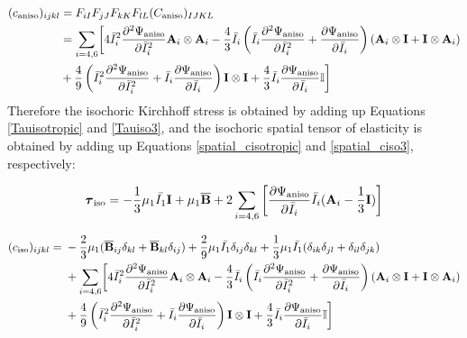 \begin{appendices}
\begin{equation} \label{spatial_ciso3}
\begin{split}
(c_\mathrm{aniso})_{ijkl} &=  F_{iI}F_{jJ}F_{kK}F_{lL}(C_\mathrm{aniso})_{IJKL} \\
&= 
 \sum_{i = 4, 6} \biggl[4{\bar{I}_i}^2\frac{\partial^2\Psi_\mathrm{aniso}}{\partial{\bar{I}_i}^2} \bold{A}_{i} \otimes \bold{A}_{i} - \frac{4}{3}\bar{I}_i\left(\bar{I}_i\frac{\partial^2\Psi_\mathrm{aniso}}{\partial{\bar{I}_i}^2} + \frac{\partial\Psi_\mathrm{aniso}}{\partial{\bar{I}_i}}\right)
 (\bold{A}_{i} \otimes \bold{I} + \bold{I} \otimes \bold{A}_i) \\
&+ \frac{4}{9}\left({\bar{I}_i}^2\frac{\partial^2\Psi_\mathrm{aniso}}{\partial{\bar{I}_i}^2} + \bar{I}_i\frac{\partial\Psi_\mathrm{aniso}}{\partial{\bar{I}_i}}\right)\bold{I} \otimes \bold{I} 
+ \frac{4}{3}\bar{I}_i \frac{\partial\Psi_\mathrm{aniso}}{\partial{\bar{I}_i}} \mathbb{I} \biggr]
\end{split}
\end{equation}
Therefore the isochoric Kirchhoff stress is obtained by adding up Equations \ref{Tauisotropic} and \ref{Tauiso3}, and the isochoric spatial tensor of elasticity is obtained by adding up Equations \ref{spatial_cisotropic} and \ref{spatial_ciso3}, respectively:

\begin{equation} \label{HGO_tauiso}
\boldsymbol{\tau}_\mathrm{iso} =  - \frac{1}{3}\mu_1\bar{I_1}\bold{I} + \mu_1{\overline{\bold{B}}}
+ 2\sum_{i = 4, 6}\left[\frac{\partial{\Psi_\mathrm{aniso}}}{\partial{\bar{I}_i}}\bar{I}_i (\bold{A}_{i} - \frac{1}{3}\bold{I})\right]
\end{equation}
 
\begin{equation} \label{HGO_spatial_ciso}
\begin{split}
(c_\mathrm{iso})_{ijkl} = {} &  - \frac{2}{3}\mu_1({\overline{\bold{B}}}_{ij}\delta_{kl} + {\overline{\bold{B}}}_{kl}\delta_{ij}) 
+ \frac{2}{9}\mu_1\bar{I_1}  \delta_{ij}\delta_{kl}
+ \frac{1}{3}\mu_1\bar{I_1} (\delta_{ik}\delta_{jl} + \delta_{il}\delta_{jk}) \\
&+ 
\sum_{i = 4, 6} \biggl[4{\bar{I}_i}^2\frac{\partial^2\Psi_\mathrm{aniso}}{\partial{\bar{I}_i}^2} \bold{A}_{i} \otimes \bold{A}_{i} - \frac{4}{3}\bar{I}_i\left(\bar{I}_i\frac{\partial^2\Psi_\mathrm{aniso}}{\partial{\bar{I}_i}^2} + \frac{\partial\Psi_\mathrm{aniso}}{\partial{\bar{I}_i}}\right)
 (\bold{A}_{i} \otimes \bold{I} + \bold{I} \otimes \bold{A}_i) \\
&+ 
\frac{4}{9}\left({\bar{I}_i}^2\frac{\partial^2\Psi_\mathrm{aniso}}{\partial{\bar{I}_i}^2} + \bar{I}_i\frac{\partial\Psi_\mathrm{aniso}}{\partial{\bar{I}_i}}\right)\bold{I} \otimes \bold{I} 
+ \frac{4}{3}\bar{I}_i \frac{\partial\Psi_\mathrm{aniso}}{\partial{\bar{I}_i}} \mathbb{I} \biggr]
\end{split}
\end{equation}


\end{appendices}
